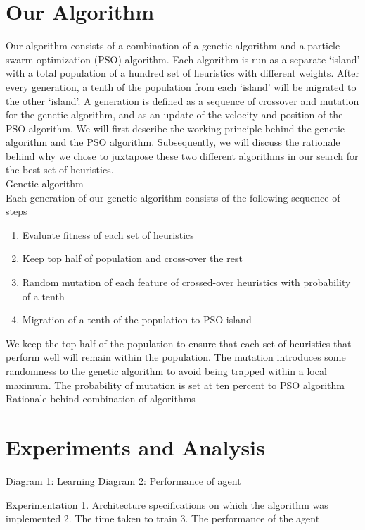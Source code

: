 \documentclass{article}
\begin{document}
    \section{Our Algorithm}

    Our algorithm consists of a combination of a genetic algorithm and a particle swarm
	optimization (PSO) algorithm. Each algorithm is run as a separate ‘island’ with
	a total population of a hundred set of heuristics with different weights.
	After every generation, a tenth of the population from each ‘island’ will be
	migrated to the other ‘island’. A generation is defined as a sequence of crossover
	and mutation for the genetic algorithm, and as an update of the velocity and
	position of the PSO algorithm. We will first describe the working principle
	behind the genetic algorithm and the PSO algorithm. Subsequently, we will
	discuss the rationale behind why we chose to juxtapose these two different
	algorithms in our search for the best set of heuristics.\\

	Genetic algorithm\\
	Each generation of our genetic algorithm consists of the following sequence of steps
	\begin{enumerate}
		\item Evaluate fitness of each set of heuristics
		\item Keep top half of population and cross-over the rest
		\item Random mutation of each feature of crossed-over heuristics with probability of a tenth
		\item Migration of a tenth of the population to PSO island
	\end{enumerate}
	We keep the top half of the population to ensure that each set of heuristics that perform well will remain within the population. The mutation introduces some randomness to the genetic algorithm to avoid being trapped within a local maximum. The probability of mutation is set at ten percent to
	PSO algorithm\\

	Rationale behind combination of algorithms

    \section{Experiments and Analysis}

    Diagram 1: Learning
    Diagram 2: Performance of agent

    Experimentation
        1. Architecture specifications on which the algorithm was implemented
        2. The time taken to train
        3. The performance of the agent
\end{document}
